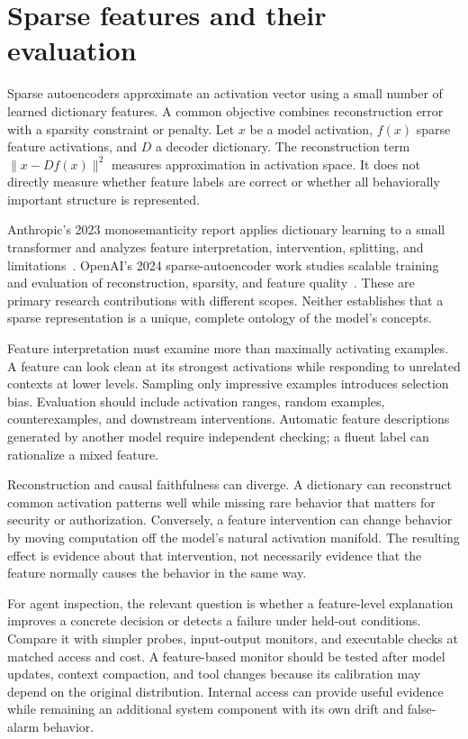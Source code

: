 \section{Sparse features and their evaluation}\label{sec:C25:sparse}
Sparse autoencoders approximate an activation vector using a small number of learned dictionary features. A common objective combines reconstruction error with a sparsity constraint or penalty. Let $x$ be a model activation, $f(x)$ sparse feature activations, and $D$ a decoder dictionary. The reconstruction term $\|x-Df(x)\|^2$ measures approximation in activation space. It does not directly measure whether feature labels are correct or whether all behaviorally important structure is represented.

Anthropic's 2023 monosemanticity report applies dictionary learning to a small transformer and analyzes feature interpretation, intervention, splitting, and limitations~\cite{bricken2023monosemanticity}. OpenAI's 2024 sparse-autoencoder work studies scalable training and evaluation of reconstruction, sparsity, and feature quality~\cite{gao2024sae}. These are primary research contributions with different scopes. Neither establishes that a sparse representation is a unique, complete ontology of the model's concepts.

Feature interpretation must examine more than maximally activating examples. A feature can look clean at its strongest activations while responding to unrelated contexts at lower levels. Sampling only impressive examples introduces selection bias. Evaluation should include activation ranges, random examples, counterexamples, and downstream interventions. Automatic feature descriptions generated by another model require independent checking; a fluent label can rationalize a mixed feature.

Reconstruction and causal faithfulness can diverge. A dictionary can reconstruct common activation patterns well while missing rare behavior that matters for security or authorization. Conversely, a feature intervention can change behavior by moving computation off the model's natural activation manifold. The resulting effect is evidence about that intervention, not necessarily evidence that the feature normally causes the behavior in the same way.

For agent inspection, the relevant question is whether a feature-level explanation improves a concrete decision or detects a failure under held-out conditions. Compare it with simpler probes, input-output monitors, and executable checks at matched access and cost. A feature-based monitor should be tested after model updates, context compaction, and tool changes because its calibration may depend on the original distribution. Internal access can provide useful evidence while remaining an additional system component with its own drift and false-alarm behavior.

